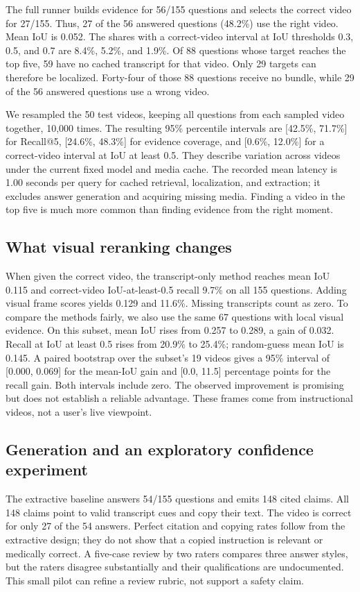 \documentclass[sigconf,authorversion,nonacm]{acmart}
\begin{document}
The full runner builds evidence for 56/155 questions and selects the correct video for 27/155. Thus, 27 of the 56 answered questions (48.2\%) use the right video. Mean IoU is 0.052. The shares with a correct-video interval at IoU thresholds 0.3, 0.5, and 0.7 are 8.4\%, 5.2\%, and 1.9\%. Of 88 questions whose target reaches the top five, 59 have no cached transcript for that video. Only 29 targets can therefore be localized. Forty-four of those 88 questions receive no bundle, while 29 of the 56 answered questions use a wrong video.

We resampled the 50 test videos, keeping all questions from each sampled video together, 10,000 times. The resulting 95\% percentile intervals are [42.5\%, 71.7\%] for Recall@5, [24.6\%, 48.3\%] for evidence coverage, and [0.6\%, 12.0\%] for a correct-video interval at IoU at least 0.5. They describe variation across videos under the current fixed model and media cache. The recorded mean latency is 1.00 seconds per query for cached retrieval, localization, and extraction; it excludes answer generation and acquiring missing media. Finding a video in the top five is much more common than finding evidence from the right moment.

\subsection{What visual reranking changes}
When given the correct video, the transcript-only method reaches mean IoU 0.115 and correct-video IoU-at-least-0.5 recall 9.7\% on all 155 questions. Adding visual frame scores yields 0.129 and 11.6\%. Missing transcripts count as zero. To compare the methods fairly, we also use the same 67 questions with local visual evidence. On this subset, mean IoU rises from 0.257 to 0.289, a gain of 0.032. Recall at IoU at least 0.5 rises from 20.9\% to 25.4\%; random-guess mean IoU is 0.145. A paired bootstrap over the subset's 19 videos gives a 95\% interval of [0.000, 0.069] for the mean-IoU gain and [0.0, 11.5] percentage points for the recall gain. Both intervals include zero. The observed improvement is promising but does not establish a reliable advantage. These frames come from instructional videos, not a user's live viewpoint.

\subsection{Generation and an exploratory confidence experiment}
The extractive baseline answers 54/155 questions and emits 148 cited claims. All 148 claims point to valid transcript cues and copy their text. The video is correct for only 27 of the 54 answers. Perfect citation and copying rates follow from the extractive design; they do not show that a copied instruction is relevant or medically correct. A five-case review by two raters compares three answer styles, but the raters disagree substantially and their qualifications are undocumented. This small pilot can refine a review rubric, not support a safety claim.
\end{document}
